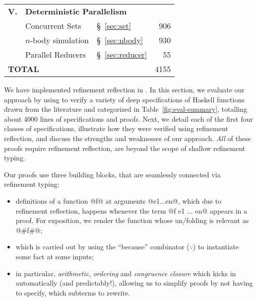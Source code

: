 \begin{table}[t!]
\begin{center}
\begin{tabular}{lllr}
  \midrule

  \textbf{V.} & \multicolumn{3}{l}{\textbf{Deterministic Parallelism}} \\[0.05in]
  & Concurrent Sets     & \S~\ref{sec:set}           & 906 \\ %
  & $n$-body simulation & \S~\ref{sec:nbody}         & 930 \\ %
  & Parallel Reducers   & \S~\ref{sec:reducer}       &  55 \\ %

  \midrule

  \multicolumn{3}{l}{\textbf{TOTAL}}                 & 4155 \\
\bottomrule
\end{tabular}
\end{center}
\end{table}

We have implemented refinement reflection
in \toolname. 
%
In this section, we evaluate our approach
by using \toolname to verify a variety of
deep specifications of Haskell functions
drawn from the literature and categorized
in Table~\ref{fig:eval-summary},
totalling about 4000 lines of specifications
and proofs.
%
Next, we detail each of the first four classes of
specifications, illustrate how they were
verified using refinement reflection, and
discuss the strengths and weaknesses of
our approach.
%
\emph{All} of these proofs require refinement
reflection, \ie are beyond the scope of shallow
refinement typing.

%
Our proofs use three building blocks, that are seamlessly
connected via refinement typing:
%
\begin{itemize}
  \item {}
     definitions of a function @f@ at
     arguments @e1...en@, which due
     to refinement reflection, happens
     whenever the term @f e1 ... en@
     appears in a proof.
     For exposition, we render the function
     whose un/folding is relevant as @#f#@;

  \item {}
     which is carried out by using
     the ``because'' combinator
     ($\because$) to instantiate
     some fact at some inputs;

  \item {}
     in particular, \emph{arithmetic},
     \emph{ordering} and \emph{congruence closure}
     which kicks in automatically (and predictably!),
     allowing us to simplify proofs by not
     having to specify, \eg which subterms
     to rewrite.
\end{itemize}

